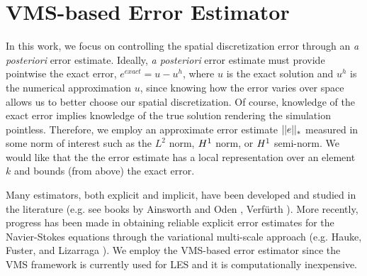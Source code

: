 \chapter{VMS-based Error Estimator}

\label{chapter:APEE} %


In this work, we focus on controlling the spatial discretization error through an \textit{a posteriori} error estimate.
Ideally, \textit{a posteriori} error estimate must provide pointwise the exact error, $e^{exact}=u-u^h$, where $u$ is the exact solution and $u^h$ is the numerical approximation $u$, since knowing how the error varies over space allows us to better choose our spatial discretization. 
Of course, knowledge of the exact error implies knowledge of the true solution rendering the simulation pointless.
Therefore, we employ an approximate error estimate $||e||_{*}$ measured in some norm of interest such as the $L^2$ norm, $H^{1}$ norm, or $H^{1}$ semi-norm.
We would like that the the error estimate has a local representation over an element $k$ and bounds (from above) the exact error.




Many estimators, both explicit and implicit, have been developed and studied in the literature (e.g. see books by Ainsworth and Oden \cite{ainsworth2011book}, Verf\"urth \cite{verfurth2013posteriori}).
More recently, progress has been made in obtaining reliable explicit error estimates for the Navier-Stokes equations through the variational multi-scale approach (e.g. Hauke, Fuster, and Lizarraga \cite{hauke2015variational}).
We employ the VMS-based error estimator since the VMS framework is currently used for LES and it is computationally inexpensive.

